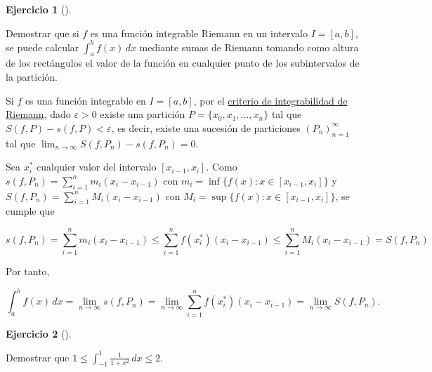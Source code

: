 \documentclass[
  spanish,
  a4paper,
]{scrreport}
\theoremstyle{definition}
\newtheorem{exercise}{Ejercicio}[chapter]
\theoremstyle{remark}
\begin{document}
\begin{exercise}[]\protect\hypertarget{exr-sumas-riemann-punto-intermedio}{}\label{exr-sumas-riemann-punto-intermedio}

Demostrar que si \(f\) es una función integrable Riemann en un intervalo
\(I=[a,b]\), se puede calcular \(\int_a^b f(x)\,dx\) mediante sumas de
Riemann tomando como altura de los rectángulos el valor de la función en
cualquier punto de los subintervalos de la partición.

\end{exercise}

\begin{tcolorbox}[enhanced jigsaw, arc=.35mm, bottomrule=.15mm, bottomtitle=1mm, breakable, colback=white, colbacktitle=quarto-callout-tip-color!10!white, colframe=quarto-callout-tip-color-frame, coltitle=black, left=2mm, leftrule=.75mm, opacityback=0, opacitybacktitle=0.6, rightrule=.15mm, title=\textcolor{quarto-callout-tip-color}{\faLightbulb}\hspace{0.5em}{Solución}, titlerule=0mm, toprule=.15mm, toptitle=1mm]

Si \(f\) es una función integrable en \(I=[a,b]\), por el
\href{https://aprendeconalf.es/analisis-manual/08-integrales.html\#thm-criterio-integrabilidad-riemann}{criterio
de integrabilidad de Riemann}, dado \(\varepsilon>0\) existe una
partición \(P=\{x_0,x_1,\ldots,x_n\}\) tal que
\(S(f,P)-s(f,P)<\varepsilon\), es decir, existe una sucesión de
particiones \((P_n)_{n=1}^\infty\) tal que
\(\lim_{n\to\infty} S(f,P_n)-s(f,P_n)=0\).

Sea \(x_i^*\) cualquier valor del intervalo \([x_{i-1},x_i]\). Como
\(s(f,P_n) = \sum_{i=1}^n m_i (x_i-x_{i-1})\) con
\(m_i=\inf\{f(x):x\in [x_{i-1},x_i]\}\) y
\(S(f,P_n) = \sum_{i=1}^n M_i (x_i-x_{i-1})\) con
\(M_i=\sup\{f(x):x\in [x_{i-1},x_i]\}\), se cumple que

\[
s(f,P_n) = \sum_{i=1}^n m_i (x_i-x_{i-1}) \leq \sum_{i=1}^n f(x_i^*) (x_i-x_{i-1}) \leq \sum_{i=1}^n M_i (x_i-x_{i-1}) = S(f,P_n)
\]

Por tanto,

\[
\int_a^b f(x)\,dx = \lim_{n\to\infty} s(f,P_n) = \lim_{n\to\infty} \sum_{i=1}^n f(x_i^*) (x_i-x_{i-1}) = \lim_{n\to\infty} S(f,P_n).
\]

\end{tcolorbox}

\begin{exercise}[]\protect\hypertarget{exr-cota-integral}{}\label{exr-cota-integral}

Demostrar que
\(1\leq \displaystyle \int_{-1}^1 \frac{1}{1+x^2}\,dx \leq 2\).

\end{exercise}
\end{document}
